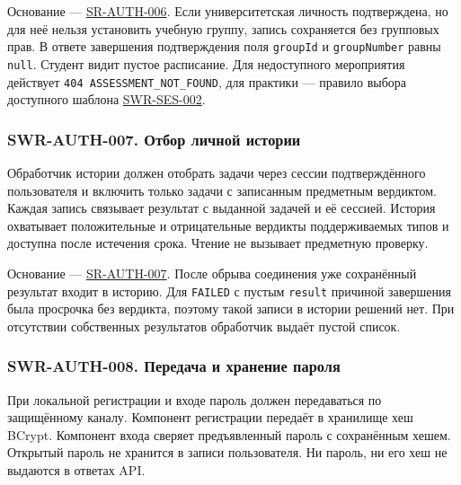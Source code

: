 \documentclass[12pt,a4paper]{article}
\begin{document}
Основание --- {\href{../04\_Системные\_требования/DOC-05\_Системные\_требования.pdf\#sr-auth-006}{SR-AUTH-006}}. Если университетская личность подтверждена, но для неё нельзя установить учебную группу, запись сохраняется без групповых прав. В ответе завершения подтверждения поля \texttt{groupId} и \texttt{group\allowbreak{}Number} равны \texttt{null}. Студент видит пустое расписание. Для недоступного мероприятия действует \texttt{404 ASSESSMENT\_\allowbreak{}NOT\_\allowbreak{}FOUND}, для практики --- правило выбора доступного шаблона {\href{DOC-06.2\_Сессии\_задач\_и\_планировщик.pdf\#swr-ses-002}{SWR-SES-002}}.

\subsubsection{SWR-AUTH-007. Отбор личной истории}\label{swr-auth-007-ux43eux442ux431ux43eux440-ux43bux438ux447ux43dux43eux439-ux438ux441ux442ux43eux440ux438ux438}

\hypertarget{swr-auth-007-отбор-личной-истории}{}

\hypertarget{swr-auth-007}{}

Обработчик истории должен отобрать задачи через сессии подтверждённого пользователя и включить только задачи с записанным предметным вердиктом. Каждая запись связывает результат с выданной задачей и её сессией. История охватывает положительные и отрицательные вердикты поддерживаемых типов и доступна после истечения срока. Чтение не вызывает предметную проверку.

Основание --- {\href{../04\_Системные\_требования/DOC-05\_Системные\_требования.pdf\#sr-auth-007}{SR-AUTH-007}}. После обрыва соединения уже сохранённый результат входит в историю. Для \texttt{FAILED} с пустым \texttt{result} причиной завершения была просрочка без вердикта, поэтому такой записи в истории решений нет. При отсутствии собственных результатов обработчик выдаёт пустой список.

\subsubsection{SWR-AUTH-008. Передача и хранение пароля}\label{swr-auth-008-ux43fux435ux440ux435ux434ux430ux447ux430-ux438-ux445ux440ux430ux43dux435ux43dux438ux435-ux43fux430ux440ux43eux43bux44f}

\hypertarget{swr-auth-008-передача-и-хранение-пароля}{}

\hypertarget{swr-auth-008}{}

При локальной регистрации и входе пароль должен передаваться по защищённому каналу. Компонент регистрации передаёт в хранилище хеш BCrypt. Компонент входа сверяет предъявленный пароль с сохранённым хешем. Открытый пароль не хранится в записи пользователя. Ни пароль, ни его хеш не выдаются в ответах API.
\end{document}
